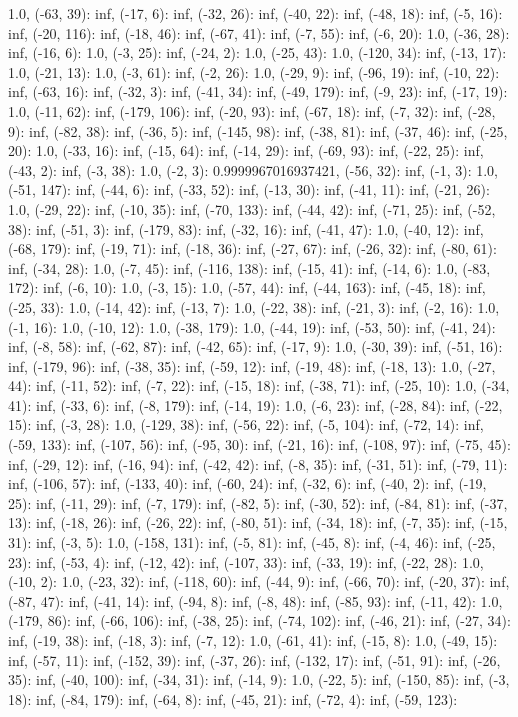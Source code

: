\documentclass[parskip=half]{scrartcl}
\begin{document}
1.0, (-63, 39): inf, (-17, 6): inf, (-32, 26): inf, (-40, 22): inf, (-48, 18): inf, (-5, 16): inf, (-20, 116): inf, (-18, 46): inf, (-67, 41): inf, (-7, 55): inf, (-6, 20): 1.0, (-36, 28): inf, (-16, 6): 1.0, (-3, 25): inf, (-24, 2): 1.0, (-25, 43): 1.0, (-120, 34): inf, (-13, 17): 1.0, (-21, 13): 1.0, (-3, 61): inf, (-2, 26): 1.0, (-29, 9): inf, (-96, 19): inf, (-10, 22): inf, (-63, 16): inf, (-32, 3): inf, (-41, 34): inf, (-49, 179): inf, (-9, 23): inf, (-17, 19): 1.0, (-11, 62): inf, (-179, 106): inf, (-20, 93): inf, (-67, 18): inf, (-7, 32): inf, (-28, 9): inf, (-82, 38): inf, (-36, 5): inf, (-145, 98): inf, (-38, 81): inf, (-37, 46): inf, (-25, 20): 1.0, (-33, 16): inf, (-15, 64): inf, (-14, 29): inf, (-69, 93): inf, (-22, 25): inf, (-43, 2): inf, (-3, 38): 1.0, (-2, 3): 0.9999967016937421, (-56, 32): inf, (-1, 3): 1.0, (-51, 147): inf, (-44, 6): inf, (-33, 52): inf, (-13, 30): inf, (-41, 11): inf, (-21, 26): 1.0, (-29, 22): inf, (-10, 35): inf, (-70, 133): inf, (-44, 42): inf, (-71, 25): inf, (-52, 38): inf, (-51, 3): inf, (-179, 83): inf, (-32, 16): inf, (-41, 47): 1.0, (-40, 12): inf, (-68, 179): inf, (-19, 71): inf, (-18, 36): inf, (-27, 67): inf, (-26, 32): inf, (-80, 61): inf, (-34, 28): 1.0, (-7, 45): inf, (-116, 138): inf, (-15, 41): inf, (-14, 6): 1.0, (-83, 172): inf, (-6, 10): 1.0, (-3, 15): 1.0, (-57, 44): inf, (-44, 163): inf, (-45, 18): inf, (-25, 33): 1.0, (-14, 42): inf, (-13, 7): 1.0, (-22, 38): inf, (-21, 3): inf, (-2, 16): 1.0, (-1, 16): 1.0, (-10, 12): 1.0, (-38, 179): 1.0, (-44, 19): inf, (-53, 50): inf, (-41, 24): inf, (-8, 58): inf, (-62, 87): inf, (-42, 65): inf, (-17, 9): 1.0, (-30, 39): inf, (-51, 16): inf, (-179, 96): inf, (-38, 35): inf, (-59, 12): inf, (-19, 48): inf, (-18, 13): 1.0, (-27, 44): inf, (-11, 52): inf, (-7, 22): inf, (-15, 18): inf, (-38, 71): inf, (-25, 10): 1.0, (-34, 41): inf, (-33, 6): inf, (-8, 179): inf, (-14, 19): 1.0, (-6, 23): inf, (-28, 84): inf, (-22, 15): inf, (-3, 28): 1.0, (-129, 38): inf, (-56, 22): inf, (-5, 104): inf, (-72, 14): inf, (-59, 133): inf, (-107, 56): inf, (-95, 30): inf, (-21, 16): inf, (-108, 97): inf, (-75, 45): inf, (-29, 12): inf, (-16, 94): inf, (-42, 42): inf, (-8, 35): inf, (-31, 51): inf, (-79, 11): inf, (-106, 57): inf, (-133, 40): inf, (-60, 24): inf, (-32, 6): inf, (-40, 2): inf, (-19, 25): inf, (-11, 29): inf, (-7, 179): inf, (-82, 5): inf, (-30, 52): inf, (-84, 81): inf, (-37, 13): inf, (-18, 26): inf, (-26, 22): inf, (-80, 51): inf, (-34, 18): inf, (-7, 35): inf, (-15, 31): inf, (-3, 5): 1.0, (-158, 131): inf, (-5, 81): inf, (-45, 8): inf, (-4, 46): inf, (-25, 23): inf, (-53, 4): inf, (-12, 42): inf, (-107, 33): inf, (-33, 19): inf, (-22, 28): 1.0, (-10, 2): 1.0, (-23, 32): inf, (-118, 60): inf, (-44, 9): inf, (-66, 70): inf, (-20, 37): inf, (-87, 47): inf, (-41, 14): inf, (-94, 8): inf, (-8, 48): inf, (-85, 93): inf, (-11, 42): 1.0, (-179, 86): inf, (-66, 106): inf, (-38, 25): inf, (-74, 102): inf, (-46, 21): inf, (-27, 34): inf, (-19, 38): inf, (-18, 3): inf, (-7, 12): 1.0, (-61, 41): inf, (-15, 8): 1.0, (-49, 15): inf, (-57, 11): inf, (-152, 39): inf, (-37, 26): inf, (-132, 17): inf, (-51, 91): inf, (-26, 35): inf, (-40, 100): inf, (-34, 31): inf, (-14, 9): 1.0, (-22, 5): inf, (-150, 85): inf, (-3, 18): inf, (-84, 179): inf, (-64, 8): inf, (-45, 21): inf, (-72, 4): inf, (-59, 123): 
\end{document}
